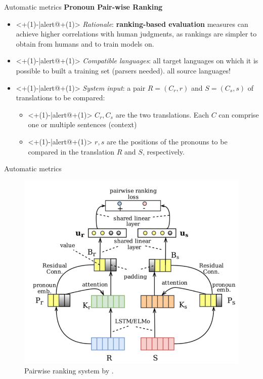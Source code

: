 \begin{frame}{Automatic metrics}	
	\textbf{Pronoun Pair-wise Ranking} \cite{jwalapuram_evaluating_2019}	
	\begin{itemize}
		\item<+(1)-|alert@+(1)> \textit{Rationale}: \textbf{ranking-based evaluation} measures can achieve higher correlations with human judgments, as rankings are simpler to obtain from humans and to train models on.
		\item<+(1)-|alert@+(1)> \textit{Compatible languages}: all target languages on which it is possible to built a training set (parsers needed). all source languages!
		\item<+(1)-|alert@+(1)> \textit{System input}: a pair $R=(C_r, r)$ and $S=(C_s, s)$ of translations to be compared:
		\begin{itemize}
			\item<+(1)-|alert@+(1)> $C_r,C_s$ are the two translations. Each $C$ can comprise one or multiple sentences (context)
			\item<+(1)-|alert@+(1)> $r,s$ are the positions of the pronouns to be compared in the translation $R$ and $S$, respectively.
		\end{itemize} 
	\end{itemize}	
\end{frame}

\begin{frame}{Automatic metrics}	
	\begin{figure}
		\centering
		\includegraphics[width=0.55\linewidth]{Images/jwalapuram_2019_pronoun_ranker}
		\caption{Pairwise ranking system by \cite{jwalapuram_evaluating_2019}.}
		\label{fig:jwalapuram2019pronounranker}
	\end{figure}
\end{frame}

